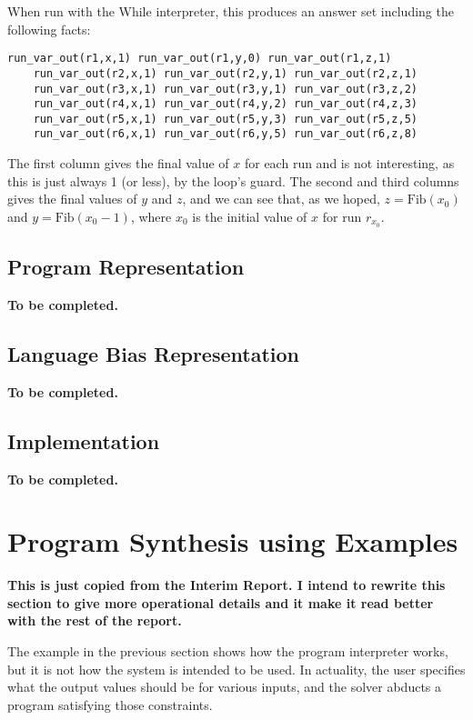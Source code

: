 \documentclass[a4paper,twoside,notitlepage]{article}
\begin{document}
When run with the While interpreter, this produces an answer set including the 
following facts:
\begin{Verbatim}[samepage=true]
    run_var_out(r1,x,1) run_var_out(r1,y,0) run_var_out(r1,z,1) 
    run_var_out(r2,x,1) run_var_out(r2,y,1) run_var_out(r2,z,1) 
    run_var_out(r3,x,1) run_var_out(r3,y,1) run_var_out(r3,z,2) 
    run_var_out(r4,x,1) run_var_out(r4,y,2) run_var_out(r4,z,3)
    run_var_out(r5,x,1) run_var_out(r5,y,3) run_var_out(r5,z,5)
    run_var_out(r6,x,1) run_var_out(r6,y,5) run_var_out(r6,z,8) 
\end{Verbatim}
The first column gives the final value of $x$ for each run and is not 
interesting, as this is just always 1 (or less), by the loop's guard. The 
second and third columns gives the final values of $y$ and $z$, and we can see 
that, as we hoped, $z=\textrm{Fib}(x_0)$ and $y=\textrm{Fib}(x_0-1)$, where 
$x_0$ is the initial value of $x$ for run $r_{x_0}$.

\subsection{Program Representation}
\textbf{To be completed.}

\subsection{Language Bias Representation}
\textbf{To be completed.}

\subsection{Implementation}
\textbf{To be completed.}

\clearpage

\section{Program Synthesis using Examples} \label{sec:synexm}
\textbf{This is just copied from the Interim Report. I intend to rewrite 
this section to give more operational details and it make it read better 
with the rest of the report.}

The example in the previous section shows how the program interpreter 
works, but it is not how the system is intended to be used. In actuality, 
the user specifies what the output values should be for various inputs, 
and the solver abducts a program satisfying those constraints.
\end{document}
